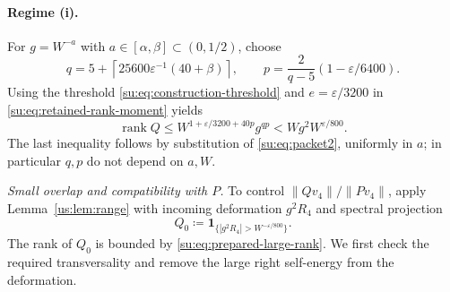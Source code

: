 \documentclass[11pt]{article}
\numberwithin{equation}{section}
\theoremstyle{remark}
\newcommand{\rank}{\operatorname{rank}}
\begin{document}
\paragraph{Regime (i).}
For $g=W^{-a}$ with $a\in[\alpha,\beta]\subset(0,1/2)$, choose
\begin{equation}\label{su:eq:packet2}
 q=5+\left\lceil25600\varepsilon^{-1} (40+\beta)\right\rceil,\qquad
 p=\frac2{q-5}(1-\varepsilon/6400).
\end{equation}
Using the threshold \eqref{su:eq:construction-threshold} and
$e=\varepsilon/3200$ in \eqref{su:eq:retained-rank-moment} yields
\begin{equation}\label{su:eq:rank}
 \rank Q\le W^{1+\varepsilon/3200+40p}g^{qp}
 <Wg^2W^{\varepsilon/800}.
\end{equation}
The last inequality follows by substitution of \eqref{su:eq:packet2},
uniformly in $a$; in particular $q,p$ do not depend on $a,W$.

\smallskip\noindent
\emph{Small overlap and compatibility with $P$.}
To control $\|Qv_4\|/\|Pv_4\|$, apply Lemma~\ref{us:lem:range} with
incoming deformation $g^2R_4$ and spectral projection
\[
 Q_0\coloneqq\mathbf1_{\{|g^2R_4|>W^{-\varepsilon/800}\}}.
\]
The rank of $Q_0$ is bounded by \eqref{su:eq:prepared-large-rank}. We first
check the required transversality and remove the large right
self-energy from the deformation.
\end{document}
